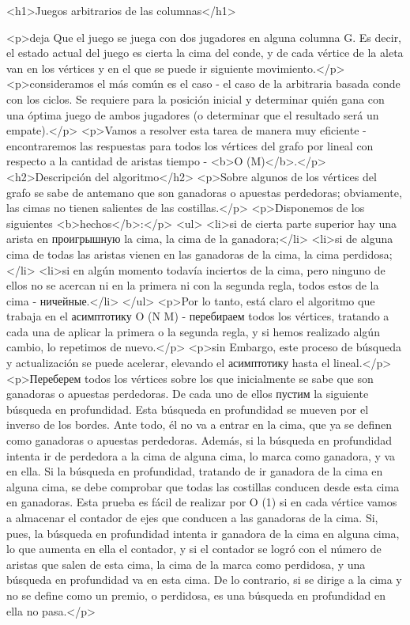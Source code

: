 <h1>Juegos arbitrarios de las columnas</h1>

<p>deja Que el juego se juega con dos jugadores en alguna columna G. Es decir, el estado actual del juego es cierta la cima del conde, y de cada vértice de la aleta van en los vértices y en el que se puede ir siguiente movimiento.</p>
<p>consideramos el más común es el caso - el caso de la arbitraria basada conde con los ciclos. Se requiere para la posición inicial y determinar quién gana con una óptima juego de ambos jugadores (o determinar que el resultado será un empate).</p>
<p>Vamos a resolver esta tarea de manera muy eficiente - encontraremos las respuestas para todos los vértices del grafo por lineal con respecto a la cantidad de aristas tiempo - <b>O (M)</b>.</p>
<h2>Descripción del algoritmo</h2>
<p>Sobre algunos de los vértices del grafo se sabe de antemano que son ganadoras o apuestas perdedoras; obviamente, las cimas no tienen salientes de las costillas.</p>
<p>Disponemos de los siguientes <b>hechos</b>:</p>
<ul>
<li>si de cierta parte superior hay una arista en проигрышную la cima, la cima de la ganadora;</li>
<li>si de alguna cima de todas las aristas vienen en las ganadoras de la cima, la cima perdidosa;</li>
<li>si en algún momento todavía inciertos de la cima, pero ninguno de ellos no se acercan ni en la primera ni con la segunda regla, todos estos de la cima - ничейные.</li>
</ul>
<p>Por lo tanto, está claro el algoritmo que trabaja en el асимптотику O (N M) - перебираем todos los vértices, tratando a cada una de aplicar la primera o la segunda regla, y si hemos realizado algún cambio, lo repetimos de nuevo.</p>
<p>sin Embargo, este proceso de búsqueda y actualización se puede acelerar, elevando el асимптотику hasta el lineal.</p>
<p>Переберем todos los vértices sobre los que inicialmente se sabe que son ganadoras o apuestas perdedoras. De cada uno de ellos пустим la siguiente búsqueda en profundidad. Esta búsqueda en profundidad se mueven por el inverso de los bordes. Ante todo, él no va a entrar en la cima, que ya se definen como ganadoras o apuestas perdedoras. Además, si la búsqueda en profundidad intenta ir de perdedora a la cima de alguna cima, lo marca como ganadora, y va en ella. Si la búsqueda en profundidad, tratando de ir ganadora de la cima en alguna cima, se debe comprobar que todas las costillas conducen desde esta cima en ganadoras. Esta prueba es fácil de realizar por O (1) si en cada vértice vamos a almacenar el contador de ejes que conducen a las ganadoras de la cima. Si, pues, la búsqueda en profundidad intenta ir ganadora de la cima en alguna cima, lo que aumenta en ella el contador, y si el contador se logró con el número de aristas que salen de esta cima, la cima de la marca como perdidosa, y una búsqueda en profundidad va en esta cima. De lo contrario, si se dirige a la cima y no se define como un premio, o perdidosa, es una búsqueda en profundidad en ella no pasa.</p>
